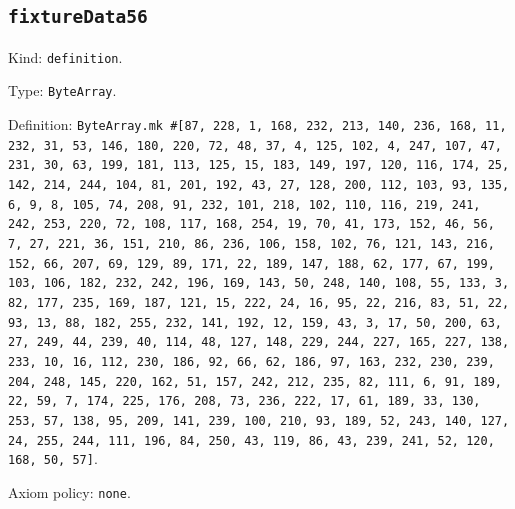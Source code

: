 \documentclass[11pt]{article}
\begin{document}
\subsection*{\texttt{fixtureData56}}
\noindent Kind: \texttt{definition}.\par
\noindent Type: \texttt{ByteArray}.\par
\noindent Definition: \texttt{ByteArray.mk \#[87, 228, 1, 168, 232, 213, 140, 236, 168, 11, 232, 31, 53, 146, 180, 220, 72, 48, 37, 4, 125, 102, 4, 247, 107, 47, 231, 30, 63, 199, 181, 113, 125, 15, 183, 149, 197, 120, 116, 174, 25, 142, 214, 244, 104, 81, 201, 192, 43, 27, 128, 200, 112, 103, 93, 135, 6, 9, 8, 105, 74, 208, 91, 232, 101, 218, 102, 110, 116, 219, 241, 242, 253, 220, 72, 108, 117, 168, 254, 19, 70, 41, 173, 152, 46, 56, 7, 27, 221, 36, 151, 210, 86, 236, 106, 158, 102, 76, 121, 143, 216, 152, 66, 207, 69, 129, 89, 171, 22, 189, 147, 188, 62, 177, 67, 199, 103, 106, 182, 232, 242, 196, 169, 143, 50, 248, 140, 108, 55, 133, 3, 82, 177, 235, 169, 187, 121, 15, 222, 24, 16, 95, 22, 216, 83, 51, 22, 93, 13, 88, 182, 255, 232, 141, 192, 12, 159, 43, 3, 17, 50, 200, 63, 27, 249, 44, 239, 40, 114, 48, 127, 148, 229, 244, 227, 165, 227, 138, 233, 10, 16, 112, 230, 186, 92, 66, 62, 186, 97, 163, 232, 230, 239, 204, 248, 145, 220, 162, 51, 157, 242, 212, 235, 82, 111, 6, 91, 189, 22, 59, 7, 174, 225, 176, 208, 73, 236, 222, 17, 61, 189, 33, 130, 253, 57, 138, 95, 209, 141, 239, 100, 210, 93, 189, 52, 243, 140, 127, 24, 255, 244, 111, 196, 84, 250, 43, 119, 86, 43, 239, 241, 52, 120, 168, 50, 57]}.\par
\noindent Axiom policy: \texttt{none}.\par
\end{document}
